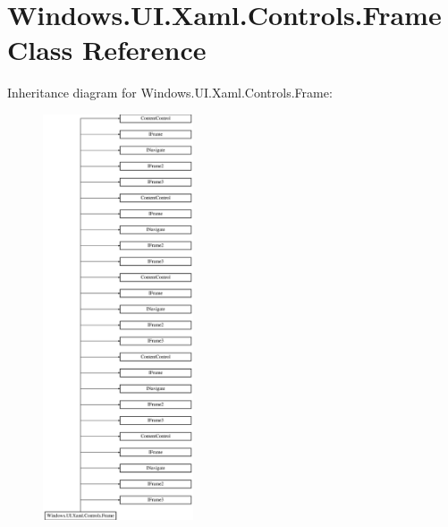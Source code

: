 \hypertarget{class_windows_1_1_u_i_1_1_xaml_1_1_controls_1_1_frame}{}\section{Windows.\+U\+I.\+Xaml.\+Controls.\+Frame Class Reference}
\label{class_windows_1_1_u_i_1_1_xaml_1_1_controls_1_1_frame}
Inheritance diagram for Windows.\+U\+I.\+Xaml.\+Controls.\+Frame\+:\begin{figure}[H]
\begin{center}
\leavevmode
\includegraphics[height=12.000000cm]{class_windows_1_1_u_i_1_1_xaml_1_1_controls_1_1_frame}
\end{center}
\end{figure}
